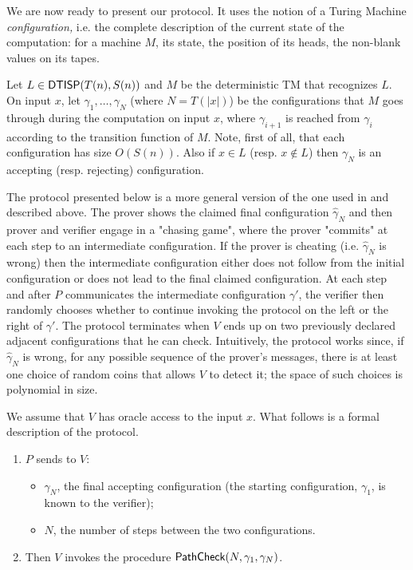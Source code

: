 \label{sec:protocol}
\label{sec:rp-dtisp}
We are now ready to present our protocol. It uses the notion of a Turing Machine {\em configuration,} i.e. 
the complete description of the current state of the computation: for a machine $M$, its state, the position of its heads, the non-blank values on its tapes.  

Let $L \in {\ensuremath{\mathsf{DTISP}}}(T(n),S(n))$ and $M$ be the deterministic TM that recognizes $L$. 
On input $x$, let $\gamma_1,\ldots,\gamma_N$ (where $N=T(|x|)$) be the 
configurations that $M$ goes through during the computation on input $x$, where 
$\gamma_{i+1}$ is reached from $\gamma_i$ according to the transition function of $M$. Note, first of all, that each configuration has size $O(S(n))$. Also if $x \in L$ (resp. $x \notin L$) then $\gamma_N$ is an accepting (resp. rejecting) configuration. 


The protocol presented below is a more general version of the one used in \cite{cg15} and described above. 
The prover shows the claimed final configuration $\hat{\gamma}_N$ 
and then prover and 
verifier engage in a "chasing game", where the prover "commits" at each step to an intermediate configuration. If the prover is cheating (i.e. $\hat{\gamma}_N$ is wrong) then the intermediate configuration either does not follow from the initial configuration or does not lead to the final claimed configuration. At each step and after $P$ communicates the intermediate configuration $\gamma'$, the verifier then randomly chooses whether to continue invoking the protocol on the left or the right of $\gamma'$. The protocol terminates when $V$ ends up on two previously declared adjacent configurations that he can check.  Intuitively, the protocol works since, if $\hat{\gamma}_N$ is wrong, for any possible sequence of the prover's messages, there is at least one choice of random coins that allows $V$ to detect it; the space of such choices is polynomial in size.

We assume that $V$ has oracle access to the input $x$.
\noindent What follows is a formal description of the protocol.
\begin{framed}
\begin{enumerate}
    \item $P$ sends to $V$:
    \begin{itemize}
    \item $\gamma_{N}$, the final accepting configuration (the starting configuration, $\gamma_1$, is known to the verifier);
    \item $N$, the number of steps between the two configurations. %
    \end{itemize}
    \item Then $V$ invokes the procedure $\mathsf{PathCheck}(N, \gamma_{1}, \gamma_{N})$.
\end{enumerate}
\end{framed}

